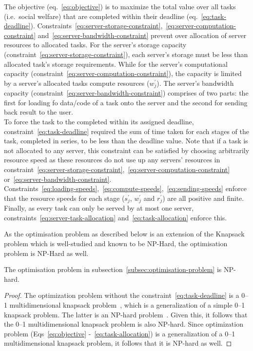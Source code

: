 The objective (eq.~\ref{eq:objective}) is to maximize the total value over all tasks (i.e.\ social welfare) that
are completed within their deadline (eq.~\ref{eq:task-deadline}).
Constraints~\ref{eq:server-storage-constraint},~\ref{eq:server-computation-constraint}
and~\ref{eq:server-bandwidth-constraint} prevent over allocation of server resources to allocated tasks.
For the server's storage capacity (constraint~\ref{eq:server-storage-constraint}), each server's storage must be less
than allocated task's storage requirements. While for the server's computational capacity
(constraint~\ref{eq:server-computation-constraint}), the capacity is limited by a server's allocated tasks
compute resources ($w^{'}_j$). The server's bandwidth capacity (constraint~\ref{eq:server-bandwidth-constraint})
comprises of two parts: the first for loading fo data/code of a task onto the server and the second for sending
back result to the user. \\
To force the task to the completed within its assigned deadline, constraint~\ref{eq:task-deadline} required the sum
of time taken for each stages of the task, completed in series, to be less than the deadline value.
Note that if a task is not allocated to any server, this constraint can be satisfied by choosing arbitrarily
resource speed as these resources do not use up any servers' resources in
constraint~\ref{eq:server-storage-constraint},~\ref{eq:server-computation-constraint}
or~\ref{eq:server-bandwidth-constraint}. \\
Constraints~\ref{eq:loading-speeds},~\ref{eq:compute-speeds},~\ref{eq:sending-speeds} enforce that the resource
speeds for each stage ($s^{'}_j$, $w^{'}_j$ and $r^{'}_j$) are all positive and finite.
Finally, as every task can only be served by at most one server, constraints~\ref{eq:server-task-allocation}
and~\ref{eq:task-allocation} enforce this.

As the optimisation problem as described below is an extension of the Knapsack problem which is well-studied and
known to be NP-Hard, the optimisation problem is NP-Hard as well.

\begin{theorem}
    The optimisation problem in subsection~\ref{subsec:optimisation-problem} is NP-hard.
\end{theorem}
\begin{proof}
    The optimization problem without the constraint~\ref{eq:task-deadline} is a 0--1 multidimensional knapsack
    problem~\cite{knapsackproblems_2004}, which is a generalization of a simple 0--1 knapsack problem. The latter is an
    NP-hard problem~\cite{knapsackproblems_2004}. Given this, it follows that the 0--1 multidimensional knapsack problem
    is also NP-hard. Since optimization problem (Eqs~\ref{eq:objective} -~\ref{eq:task-allocation}) is a
    generalization of a 0--1 multidimensional knapsack problem, it follows that it is NP-hard as well.
\end{proof}

